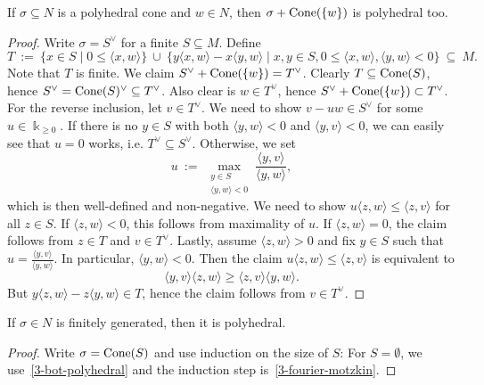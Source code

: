 \begin{proposition}
  \label{3-fourier-motzkin}
  \leanok
  If \( \sigma \subseteq N \) is a polyhedral cone and \( w \in N \),
  then \( \sigma + \operatorname{Cone}(\{w\}) \) is polyhedral too.
\end{proposition}
\begin{proof}
  \leanok
  Write \( \sigma = S^{\vee} \) for a finite \( S \subseteq M \).
  Define
  \[
      T\ :=\ \{x \in S \mid 0 \leq \langle x, w \rangle \}\ \cup\ 
      \{y \langle x, w \rangle - x \langle y, w \rangle \mid x, y \in
      S, 0 \leq \langle x, w \rangle, \langle y, w \rangle < 0 \}\ 
      \subseteq\ M.
  \]
  Note that \( T \) is finite. We claim \( S^{\vee} + \operatorname{Cone}(\{w\}) =
  T^{\vee} \). Clearly \( T \subseteq \operatorname{Cone}(S) \), hence \( S^{\vee} =
  \operatorname{Cone}(S)^{\vee} \subseteq T^{\vee} \). Also clear is \( w \in
  T^{\vee} \), hence \( S^{\vee} + \operatorname{Cone}(\{w\}) \subset T^{\vee} \).
  For the reverse inclusion, let \( v \in T^\vee \). We need to show
  \( v - uw \in S^\vee \) for some \( u \in \Bbbk_{\geq 0} \). If
  there is no \( y \in S \) with both \( \langle y, w \rangle < 0 \)
  and \( \langle y, v \rangle < 0 \), we can easily see that \( u = 0
  \) works, i.e. \( T^{\vee} \subseteq S^{\vee} \). Otherwise, we
  set
  \[
      u\ :=\ \max_{\substack{y \in S \\ \langle y, w \rangle < 0}}
      \frac{\langle y, v \rangle}{\langle y, w \rangle},
  \]
  which is then well-defined and non-negative. We need to show
  \( u \langle z, w \rangle \leq \langle z, v \rangle \) for all \( z
  \in S \). If \( \langle z, w \rangle < 0 \), this follows from
  maximality of \( u \). If \( \langle z, w \rangle = 0 \), the claim
  follows from \( z \in T \) and \( v \in T^{\vee} \). Lastly, assume
  \( \langle z, w \rangle > 0 \) and fix \( y \in S \) such that \( u
  = \frac{\langle y, v \rangle}{\langle y, w \rangle} \). In
  particular, \( \langle y, w \rangle < 0 \). Then the claim \( u
  \langle z, w \rangle \leq \langle z, v \rangle \) is equivalent to
  \[
      \langle y, v \rangle \langle z, w \rangle \geq
      \langle z, v \rangle \langle y, w \rangle.
  \]
  But \( y \langle z, w \rangle - z \langle y, w \rangle \in T \),
  hence the claim follows from \( v \in T^{\vee} \).
\end{proof}

\begin{proposition}
  \label{3-polyhedral-of-fg}
  \lean{}
  \leanok
  If \( \sigma \in N \) is finitely generated, then it is polyhedral.
\end{proposition}
\begin{proof}
  \leanok
  Write \( \sigma = \operatorname{Cone}(S) \) and use induction on the size of \( S
  \): For \( S = \emptyset \), we use~\ref{3-bot-polyhedral}
  and the induction step is~\ref{3-fourier-motzkin}.
\end{proof}

